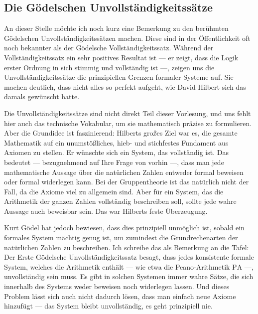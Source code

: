 \subsection{Die Gödelschen Unvollständigkeitssätze}

\begin{spoken-clean}[00:59:17 - 01:01:38]
An dieser Stelle möchte ich noch kurz eine Bemerkung zu den berühmten Gödelschen Unvollständigkeitssätzen machen. Diese sind in der Öffentlichkeit oft noch bekannter als der Gödelsche Vollständigkeitssatz. Während der Vollständigkeitssatz ein sehr positives Resultat ist --- er zeigt, dass die Logik erster Ordnung in sich stimmig und vollständig ist ---, zeigen uns die Unvollständigkeitssätze die prinzipiellen Grenzen formaler Systeme auf. Sie machen deutlich, dass nicht alles so perfekt aufgeht, wie David Hilbert sich das damals gewünscht hatte.

Die Unvollständigkeitssätze sind nicht direkt Teil dieser Vorlesung, und uns fehlt hier auch das technische Vokabular, um sie mathematisch präzise zu formulieren. Aber die Grundidee ist faszinierend: Hilberts großes Ziel war es, die gesamte Mathematik auf ein unumstößliches, hieb- und stichfestes Fundament aus Axiomen zu stellen. Er wünschte sich ein System, das vollständig ist. Das bedeutet --- bezugnehmend auf Ihre Frage von vorhin ---, dass man jede mathematische Aussage über die natürlichen Zahlen entweder formal beweisen oder formal widerlegen kann. Bei der Gruppentheorie ist das natürlich nicht der Fall, da die Axiome viel zu allgemein sind. Aber für ein System, das die Arithmetik der ganzen Zahlen vollständig beschreiben soll, sollte jede wahre Aussage auch beweisbar sein. Das war Hilberts feste Überzeugung.

Kurt Gödel hat jedoch bewiesen, dass dies prinzipiell unmöglich ist, sobald ein formales System mächtig genug ist, um zumindest die Grundrechenarten der natürlichen Zahlen zu beschreiben. Ich schreibe das als Bemerkung an die Tafel: Der Erste Gödelsche Unvollständigkeitssatz besagt, dass jedes konsistente formale System, welches die Arithmetik enthält --- wie etwa die Peano-Arithmetik $\text{PA}$ ---, unvollständig sein muss. Es gibt in solchen Systemen immer wahre Sätze, die sich innerhalb des Systems weder beweisen noch widerlegen lassen. Und dieses Problem lässt sich auch nicht dadurch lösen, dass man einfach neue Axiome hinzufügt --- das System bleibt unvollständig, es geht prinzipiell nie.
\end{spoken-clean}


